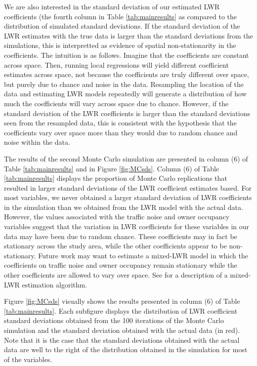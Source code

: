 \documentclass{article}\usepackage{graphicx, color}
\begin{document}
We are also interested in the standard deviation of our estimated LWR coefficients (the fourth column in Table \ref{tab:mainresults} as compared to the distribution of simulated standard deviations. If the standard deviation of the LWR estimates with the true data is larger than the standard deviations from the simulations, this is interpretted as evidence of spatial non-stationarity in the coefficients. The intuition is as follows. Imagine that the coefficients are constant across space. Then, running local regressions will yield different coefficient estimates across space, not because the coefficients are truly different over space, but purely due to chance and noise in the data. Resampling the location of the data and estimating LWR models repeatedly will generate a distribution of how much the coefficients will vary across space due to chance. However, if the standard deviation of the LWR coefficients is larger than the standard deviations seen from the resampled data, this is consistent with the hypothesis that the coefficients vary over space more than they would due to random chance and noise within the data. 

The results of the second Monte Carlo simulation are presented in column (6) of Table \ref{tab:mainresults} and in Figure \ref{fig:MCsds}. Column (6) of Table \ref{tab:mainresults} displays the proportion of Monte Carlo replications that resulted in larger standard deviations of the LWR coefficient estimates based. For most variables, we never obtained a larger standard deviation of LWR coefficients in the simulation than we obtained from the LWR model with the actual data. However, the values associated with the traffic noise and owner occupancy variables suggest that the variation in LWR coefficients for these variables in our data may have been due to random chance. These coefficients may in fact be stationary across the study area, while the other coefficients appear to be non-stationary. Future work may want to estimate a mixed-LWR model in which the coefficients on traffic noise and owner occupancy remain stationary while the other coefficients are allowed to vary over space. See \citet{Fotheringham2002} for a description of a mixed-LWR estimation algorithm. 

Figure \ref{fig:MCsds} visually shows the results presented in column (6) of Table \ref{tab:mainresults}. Each subfigure displays the distribution of LWR coefficient standard deviations obtained from the 100 iterations of the Monte Carlo simulation and the standard deviation obtained with the actual data (in red). Note that it is the case that the standard deviations obtained with the actual data are well to the right of the distribution obtained in the simulation for most of the variables.
\end{document}
